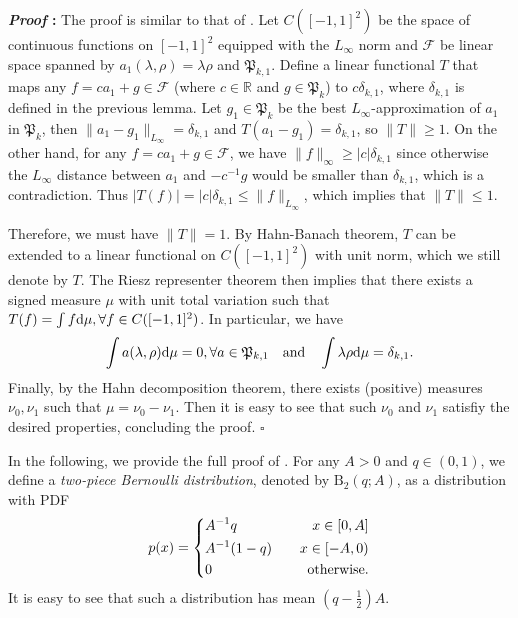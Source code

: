 \documentclass{article}
\def\gF{{\mathcal{F}}}
\newcommand{\R}{\mathbb{R}}
\newcommand{\dd}{\textup{d}}
\renewenvironment{proof}{\noindent\textbf{\textit{Proof }:}}{\hfill$\square$}
\begin{document}
\begin{proof}
    The proof is similar to that of \cite[Lemma 1]{cai2011testing}. Let $C([-1,1]^2)$ be the space of continuous functions on $[-1,1]^2$ equipped with the $L_{\infty}$ norm and $\gF$ be linear space spanned by $a_1(\lambda,\rho)=\lambda\rho$ and $\mathfrak{P}_{k,1}$. Define a linear functional $T$ that maps any $f=ca_1+g\in\gF$ (where $c\in\R$ and $g\in\mathfrak{P}_k$) to $c\delta_{k,1}$, where $\delta_{k,1}$ is defined in the previous lemma. Let $g_1\in\mathfrak{P}_k$ be the best $L_{\infty}$-approximation of $a_1$ in $\mathfrak{P}_k$, then $\|a_1-g_1\|_{L_{\infty}}=\delta_{k,1}$ and $T(a_1-g_1)=\delta_{k,1}$, so $\|T\|\geq 1$. On the other hand, for any $f=ca_1+g\in\gF$, we have $\|f\|_{\infty}\geq |c|\delta_{k,1}$ since otherwise the $L_{\infty}$ distance between $a_1$ and $-c^{-1}g$ would be smaller than $\delta_{k,1}$, which is a contradiction. Thus $|T(f)|=|c|\delta_{k,1}\leq \|f\|_{L_{\infty}}$, which implies that $\|T\|\leq 1$.

    Therefore, we must have $\|T\|=1$. By Hahn-Banach theorem, $T$ can be extended to a linear functional on $C([-1,1]^2)$ with unit norm, which we still denote by $T$. The Riesz representer theorem then implies that there exists a signed measure $\mu$ with unit total variation such that $T(f)=\int f\dd\mu, \forall f\in C([-1,1]^2)$. In particular, we have
    \begin{equation}
        \notag
        \int a(\lambda,\rho)\dd\mu = 0, \forall a\in\mathfrak{P}_{k,1} \quad \text{and}\quad \int \lambda\rho\dd\mu=\delta_{k,1}.
    \end{equation}
    Finally, by the Hahn decomposition theorem, there exists (positive) measures $\nu_0,\nu_1$ such that $\mu=\nu_0-\nu_1$. Then it is easy to see that such $\nu_0$ and $\nu_1$ satisfiy the desired properties, concluding the proof.
\end{proof}

In the following, we provide the full proof of . For any $A>0$ and $q\in(0,1)$, we define a \emph{two-piece Bernoulli distribution}, denoted by $\mathrm{B}_2(q;A)$, as a distribution with PDF 
\begin{equation}
    \notag
    p(x) = \left\{
    \begin{aligned}
        & A^{-1}q &\quad x\in[0,A] \\
        & A^{-1}(1-q) &\quad x\in[-A,0) \\
        & 0 &\quad \text{otherwise}.
    \end{aligned}
    \right.
\end{equation}
It is easy to see that such a distribution has mean $\left(q-\frac{1}{2}\right)A$.
\end{document}
